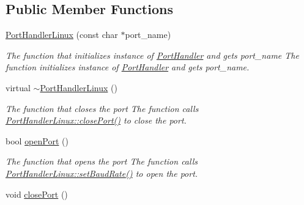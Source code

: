 \subsection*{Public Member Functions}
\begin{DoxyCompactItemize}
\item 
\hyperlink{classmercury_1_1_port_handler_linux_ac47ba79fd979eaaf39c89f6cfb5aada6}{Port\+Handler\+Linux} (const char $\ast$port\+\_\+name)\hypertarget{classmercury_1_1_port_handler_linux_ac47ba79fd979eaaf39c89f6cfb5aada6}{}\label{classmercury_1_1_port_handler_linux_ac47ba79fd979eaaf39c89f6cfb5aada6}

\begin{DoxyCompactList}\small\item\em The function that initializes instance of \hyperlink{classmercury_1_1_port_handler}{Port\+Handler} and gets port\+\_\+name  The function initializes instance of \hyperlink{classmercury_1_1_port_handler}{Port\+Handler} and gets port\+\_\+name. \end{DoxyCompactList}\item 
virtual \hyperlink{classmercury_1_1_port_handler_linux_ad950209aa592c09365d824ae1f21b28d}{$\sim$\+Port\+Handler\+Linux} ()\hypertarget{classmercury_1_1_port_handler_linux_ad950209aa592c09365d824ae1f21b28d}{}\label{classmercury_1_1_port_handler_linux_ad950209aa592c09365d824ae1f21b28d}

\begin{DoxyCompactList}\small\item\em The function that closes the port  The function calls \hyperlink{classmercury_1_1_port_handler_linux_ab224a54b1137daa5b542eb6ad38491da}{Port\+Handler\+Linux\+::close\+Port()} to close the port. \end{DoxyCompactList}\item 
bool \hyperlink{classmercury_1_1_port_handler_linux_aa28ad8fa7617a396f5fd347e716af964}{open\+Port} ()
\begin{DoxyCompactList}\small\item\em The function that opens the port  The function calls \hyperlink{classmercury_1_1_port_handler_linux_a31c5d6a569cec58d20f9041f100a637c}{Port\+Handler\+Linux\+::set\+Baud\+Rate()} to open the port. \end{DoxyCompactList}\item 
void \hyperlink{classmercury_1_1_port_handler_linux_ab224a54b1137daa5b542eb6ad38491da}{close\+Port} ()\hypertarget{classmercury_1_1_port_handler_linux_ab224a54b1137daa5b542eb6ad38491da}{}\label{classmercury_1_1_port_handler_linux_ab224a54b1137daa5b542eb6ad38491da}


\end{DoxyCompactItemize}
